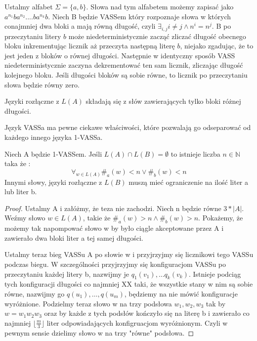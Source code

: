     \begin{example}
        Ustalmy alfabet $\Sigma=\{a,b\}$.
        Słowa nad tym alfabetem możemy zapisać jako $a^{n_1}ba^{n_2}....ba^{n_k}b$.
        Niech B będzie VASSem który rozpoznaje słowa w których conajmniej dwa bloki a mają równą długość, czyli $\exists_{i,j} i \neq j \land n^i = n^j$.
        B po przeczytaniu litery $b$ może niedeterministycznie zacząć zliczać długość obecnego bloku
        inkrementując licznik aż przeczyta następną literę $b$, niejako zgadując, że to jest jeden z bloków o równej długości.
        Następnie w identyczny sposób VASS niedeterministycznie zaczyna dekrementować ten sam licznik, zliczając długość kolejnego bloku.
        Jeśli długości bloków są sobie równe, to licznik po przeczytaniu słowa będzie równy zero.

        Języki rozłączne z $L(A)$ składają się z słów zawierających tylko bloki różnej długości.

        Język VASSa ma pewne ciekawe właściwości, które pozwalają go odseparować od każdego innego języka 1-VASSa.
        \begin{lemma}
            Niech A będzie 1-VASSem.
            Jeśli $L(A) \cap L(B)  = \emptyset$ to istnieje liczba $n \in \mathbb{N}$ taka że :
            \[\forall_{w \in L(A)} \#_a(w) <n \lor \#_b(w) <n\]
            Innymi słowy, języki rozłączne z $L(B)$ muszą mieć ograniczenie na ilość liter a lub liter b.
        \end{lemma}

        \begin{proof}
            Ustalmy A i załóżmy, że teza nie zachodzi.
            Niech n będzie równe $3*|A|$.
            Weźmy słowo $w \in L(A)$, takie że $\#_a(w) >n \land \#_b(w) >n$.
            Pokażemy, że możemy tak napompować słowo w by było ciągle akceptowane przez A i zawierało dwa bloki liter a tej samej długości.


            Ustalmy teraz bieg VASSu A po słowie w i przyjrzyjmy się licznikowi tego VASSu podczas biegu.
            W szczególności przyjrzyjmy się konfiguracjom VASSu po przeczytaniu każdej litery b,
            nazwijmy je $q_1(v_1), \dots q_k(v_k)$.
            Istnieje podciąg tych konfiguracji długości co najmniej XX taki, że wszystkie stany w nim są sobie równe, nazwijmy go
            $q(u_1), \dots ,q(u_m)$, będziemy na nie mówić konfiguracje wyróżnione.
            Podzielmy teraz słowo w na trzy podsłowa $w_1,w_2,w_3$ tak by $w=w_1 w_2 w_3$ oraz
            by każde z tych podsłów kończyło się na literę b i zawierało co najmniej $\lfloor\frac{m}{3} \rfloor$ liter odpowiadających konfigruacjom
            wyróżnionym.
            Czyli w pewnym sensie dzielimy słowo w na trzy "równe" podsłowa.


\end{proof}
\end{example}
